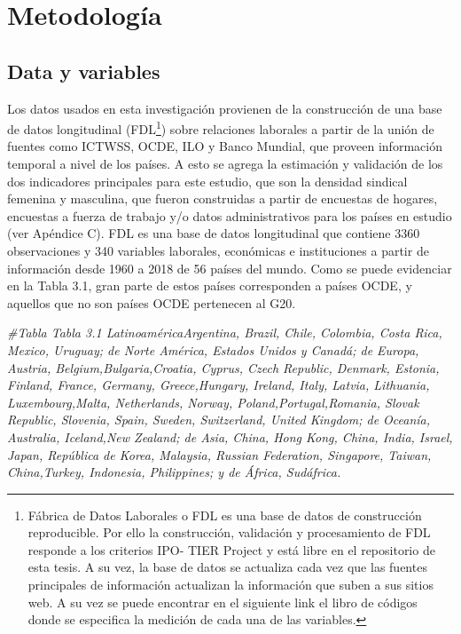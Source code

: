 \documentclass[
]{book}
\newenvironment{Shaded}{\begin{snugshade}}{\end{snugshade}}
\newcommand{\CommentTok}[1]{\textcolor[rgb]{0.56,0.35,0.01}{\textit{#1}}}
\begin{document}
\hypertarget{metodologuxeda}{%
\chapter{Metodología}\label{metodologuxeda}}

\hypertarget{data-y-variables}{%
\section{Data y variables}\label{data-y-variables}}

Los datos usados en esta investigación provienen de la construcción de una base de datos longitudinal (FDL\footnote{Fábrica de Datos Laborales o FDL es una base de datos de construcción reproducible. Por ello la construcción, validación y procesamiento de FDL responde a los criterios IPO- TIER Project y está libre en el repositorio de esta tesis. A su vez, la base de datos se actualiza cada vez que las fuentes principales de información actualizan la información que suben a sus sitios web. A su vez se puede encontrar en el siguiente link el libro de códigos donde se especifica la medición de cada una de las variables.}) sobre relaciones laborales a partir de la unión de fuentes como ICTWSS, OCDE, ILO y Banco Mundial, que proveen información temporal a nivel de los países. A esto se agrega la estimación y validación de los dos indicadores principales para este estudio, que son la densidad sindical femenina y masculina, que fueron construidas a partir de encuestas de hogares, encuestas a fuerza de trabajo y/o datos administrativos para los países en estudio (ver Apéndice C). FDL es una base de datos longitudinal que contiene 3360 observaciones y 340 variables laborales, económicas e instituciones a partir de información desde 1960 a 2018 de 56 países del mundo. Como se puede evidenciar en la Tabla 3.1, gran parte de estos países corresponden a países OCDE, y aquellos que no son países OCDE pertenecen al G20.

\begin{Shaded}
\begin{Highlighting}[]
\CommentTok{#Tabla Tabla 3.1 LatinoaméricaArgentina, Brazil, Chile, Colombia, Costa Rica, Mexico, Uruguay; de Norte América, Estados Unidos y Canadá; de Europa, Austria, Belgium,Bulgaria,Croatia, Cyprus, Czech Republic, Denmark, Estonia, Finland, France, Germany,  Greece,Hungary, Ireland, Italy, Latvia, Lithuania, Luxembourg,Malta, Netherlands, Norway, Poland,Portugal,Romania, Slovak Republic, Slovenia, Spain, Sweden, Switzerland, United Kingdom; de Oceanía, Australia, Iceland,New Zealand; de Asia, China, Hong Kong, China, India, Israel, Japan, República de Korea, Malaysia, Russian Federation,    Singapore, Taiwan, China,Turkey, Indonesia, Philippines; y de África, Sudáfrica. }
\end{Highlighting}
\end{Shaded}
\end{document}
